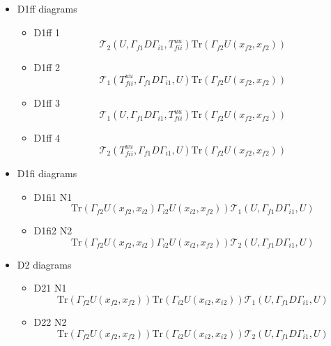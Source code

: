 \documentclass{article}[12pt]
\begin{document}
\begin{itemize}
\begin{itemize}
$$$$
\item Note that in the implementation we produce D1ii 1,2,3,4 the Dii 5,6,7,8 at the same time
\end{itemize}
\item D1ff diagrams
\begin{itemize}
\item D1ff 1
$$
{\mathcal T}_2\left(U, \Gamma_{f1}D\Gamma_{i1}, T^{uu}_{fii}\right)\mathrm{Tr}\left(\Gamma_{f2}U\left(x_{f2},x_{f2}\right)\right)
$$
\item D1ff 2
$$
{\mathcal T}_1\left(T^{uu}_{fii}, \Gamma_{f1}D\Gamma_{i1}, U\right)\mathrm{Tr}\left(\Gamma_{f2}U\left(x_{f2},x_{f2}\right)\right)
$$
\item D1ff 3 
$$
{\mathcal T}_1\left(U, \Gamma_{f1}D\Gamma_{i1}, T^{uu}_{fii}\right)\mathrm{Tr}\left(\Gamma_{f2}U\left(x_{f2},x_{f2}\right)\right)
$$ 
\item D1ff 4
$$
{\mathcal T}_2\left(T^{uu}_{fii}, \Gamma_{f1}D\Gamma_{i1}, U\right)\mathrm{Tr}\left(\Gamma_{f2}U\left(x_{f2},x_{f2}\right)\right)
$$
\end{itemize}
\item D1fi diagrams
\begin{itemize}
\item D1fi1 N1
$$
\mathrm{Tr}\left(\Gamma_{f2}U\left(x_{f2},x_{i2}\right)\Gamma_{i2}U\left(x_{i2},x_{f2}\right)\right)
{\mathcal T}_1\left(U,\Gamma_{f1}D\Gamma_{i1},U\right)
$$
\item D1fi2 N2
$$
\mathrm{Tr}\left(\Gamma_{f2}U\left(x_{f2},x_{i2}\right)\Gamma_{i2}U\left(x_{i2},x_{f2}\right)\right)
{\mathcal T}_2\left(U,\Gamma_{f1}D\Gamma_{i1},U\right)
$$
\end{itemize}
\item D2 diagrams
\begin{itemize}
\item D21 N1
$$
\mathrm{Tr}\left(\Gamma_{f2}U\left(x_{f2},x_{f2}\right)\right)\mathrm{Tr}\left(\Gamma_{i2}U\left(x_{i2},x_{i2}\right)\right){\mathcal T}_1\left(U,\Gamma_{f1}D\Gamma_{i1},U\right)
$$
\item D22 N2
$$
\mathrm{Tr}\left(\Gamma_{f2}U\left(x_{f2},x_{f2}\right)\right)\mathrm{Tr}\left(\Gamma_{i2}U\left(x_{i2},x_{i2}\right)\right){\mathcal T}_2\left(U,\Gamma_{f1}D\Gamma_{i1},U\right)
$$
\end{itemize}
\end{itemize}
\end{document}

